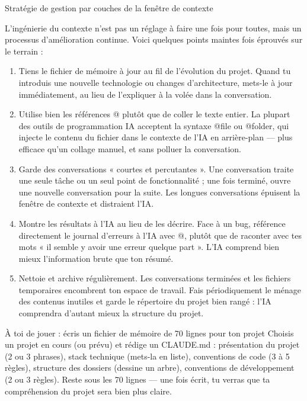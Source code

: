 \begin{center}\small\color{gray}Stratégie de gestion par couches de la fenêtre de contexte\end{center}


L'ingénierie du contexte n'est pas un réglage à faire une fois pour toutes, mais un processus d'amélioration continue. Voici quelques points maintes fois éprouvés sur le terrain :

\begin{enumerate}
  \item Tiens le fichier de mémoire à jour au fil de l'évolution du projet. Quand tu introduis une nouvelle technologie ou changes d'architecture, mets-le à jour immédiatement, au lieu de l'expliquer à la volée dans la conversation.
  \item Utilise bien les références @ plutôt que de coller le texte entier. La plupart des outils de programmation IA acceptent la syntaxe @file ou @folder, qui injecte le contenu du fichier dans le contexte de l'IA en arrière-plan — plus efficace qu'un collage manuel, et sans polluer la conversation.
  \item Garde des conversations « courtes et percutantes ». Une conversation traite une seule tâche ou un seul point de fonctionnalité ; une fois terminé, ouvre une nouvelle conversation pour la suite. Les longues conversations épuisent la fenêtre de contexte et distraient l'IA.
  \item Montre les résultats à l'IA au lieu de les décrire. Face à un bug, référence directement le journal d'erreurs à l'IA avec @, plutôt que de raconter avec tes mots « il semble y avoir une erreur quelque part ». L'IA comprend bien mieux l'information brute que ton résumé.
  \item Nettoie et archive régulièrement. Les conversations terminées et les fichiers temporaires encombrent ton espace de travail. Fais périodiquement le ménage des contenus inutiles et garde le répertoire du projet bien rangé : l'IA comprendra d'autant mieux la structure du projet.
\end{enumerate}

\begin{tcbpractice}{À toi de jouer : écris un fichier de mémoire de 70 lignes pour ton projet}
Choisis un projet en cours (ou prévu) et rédige un CLAUDE.md : présentation du projet (2 ou 3 phrases), stack technique (mets-la en liste), conventions de code (3 à 5 règles), structure des dossiers (dessine un arbre), conventions de développement (2 ou 3 règles). Reste sous les 70 lignes — une fois écrit, tu verras que ta compréhension du projet sera bien plus claire.

\end{tcbpractice}

